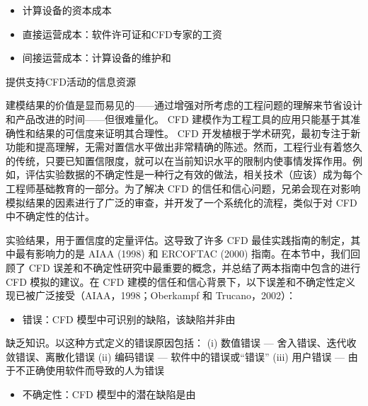 \documentclass[11pt,a4paper,openany,fontset=none]{ctexbook}
\begin{document}
\begin{itemize}

\item 计算设备的资本成本

\item 直接运营成本：软件许可证和CFD专家的工资

\item 间接运营成本：计算设备的维护和

\end{itemize}

提供支持CFD活动的信息资源

建模结果的价值是显而易见的——通过增强对所考虑的工程问题的理解来节省设计和产品改进的时间——但很难量化。 CFD 建模作为工程工具的应用只能基于其准确性和结果的可信度来证明其合理性。 CFD 开发植根于学术研究，最初专注于新功能和提高理解，无需对置信水平做出非常精确的陈述。然而，工程行业有着悠久的传统，只要已知置信限度，就可以在当前知识水平的限制内使事情发挥作用。例如，评估实验数据的不确定性是一种行之有效的做法，相关技术（应该）成为每个工程师基础教育的一部分。为了解决 CFD 的信任和信心问题，兄弟会现在对影响模拟结果的因素进行了广泛的审查，并开发了一个系统化的流程，类似于对 CFD 中不确定性的估计。

实验结果，用于置信度的定量评估。这导致了许多 CFD 最佳实践指南的制定，其中最有影响力的是 AIAA (1998) 和 ERCOFTAC (2000) 指南。在本节中，我们回顾了 CFD 误差和不确定性研究中最重要的概念，并总结了两本指南中包含的进行 CFD 模拟的建议。在 CFD 建模的信任和信心背景下，以下误差和不确定性定义现已被广泛接受（AIAA，1998；Oberkampf 和 Trucano，2002）：

\begin{itemize}

\item 错误：CFD 模型中可识别的缺陷，该缺陷并非由

\end{itemize}

缺乏知识。以这种方式定义的错误原因包括： (i) 数值错误 — 舍入错误、迭代收敛错误、离散化错误 (ii) 编码错误 — 软件中的错误或“错误” (iii) 用户错误 — 由于不正确使用软件而导致的人为错误

\begin{itemize}

\item 不确定性：CFD 模型中的潜在缺陷是由

\end{itemize}
\end{document}
